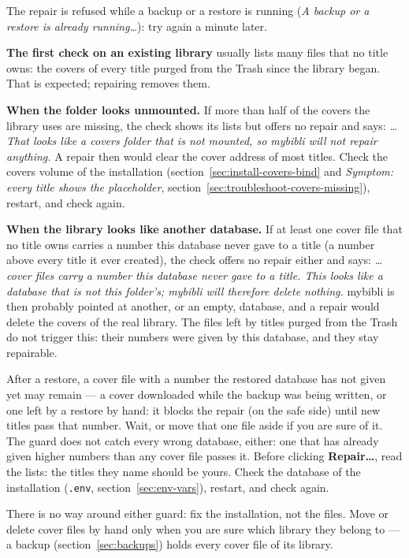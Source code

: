 The repair is refused while a backup or a restore is running (\emph{A
backup or a restore is already running\dots}): try again a minute
later.

\textbf{The first check on an existing library} usually lists many
files that no title owns: the covers of every title purged from the
Trash since the library began. That is expected; repairing removes
them.

\textbf{When the folder looks unmounted.} If more than half of the
covers the library uses are missing, the check shows its lists but
offers no repair and says: \emph{\dots{} That looks like a covers
folder that is not mounted, so mybibli will not repair anything.} A
repair then would clear the cover address of most titles. Check the
covers volume of the installation (section~\ref{sec:install-covers-bind}
and \emph{Symptom: every title shows the placeholder},
section~\ref{sec:troubleshoot-covers-missing}), restart, and check
again.

\textbf{When the library looks like another database.} If at least
one cover file that no title owns carries a number this database never
gave to a title (a number above every title it ever created), the
check offers no repair either and says: \emph{\dots{} cover files carry
a number this database never gave to a title. This looks like a
database that is not this folder's; mybibli will therefore delete
nothing.} mybibli is then probably pointed at another, or an empty,
database, and a repair would delete the covers of the real library.
The files left by titles purged from the Trash do not trigger this:
their numbers were given by this database, and they stay
repairable.

After a restore, a cover file with a number the restored database has
not given yet may remain --- a cover downloaded while the backup was
being written, or one left by a restore by hand: it blocks the repair (on the safe side) until new titles pass that
number. Wait, or move that one file aside if you are sure of it. The
guard does not catch every wrong database, either: one that has already
given higher numbers than any cover file passes it. Before clicking
\textbf{Repair…}, read the lists: the titles they name should be
yours. Check the database of the installation (\texttt{.env},
section~\ref{sec:env-vars}), restart, and check again.

There is no way around either guard: fix the installation, not the
files. Move or delete
cover files by hand only when you are sure which library they belong
to --- a backup (section~\ref{sec:backups}) holds every cover file of
its library.


